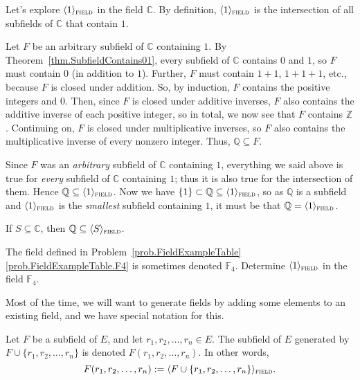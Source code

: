 \begin{example}\label{exam.GenerateField}
Let's explore  $\langle 1 \rangle_{\textsc{field}}$ in the field $\mathbb{C}$. By definition,  $\langle 1 \rangle_{\textsc{field}}$ is the intersection of all subfields of $\mathbb{C}$ that contain $1$. 

Let $F$ be an arbitrary subfield of $\mathbb{C}$ containing $1$. By Theorem~\ref{thm.SubfieldContains01}, every subfield of $\mathbb{C}$ contains $0$ and $1$, so $F$ must  contain $0$ (in addition to $1$). Further, $F$ must contain $1+1$, $1+1+1$, etc., because $F$ is closed under addition. So, by induction,  $F$ contains the positive integers and $0$. Then, since $F$ is closed under additive inverses, $F$ also contains the additive inverse of each positive integer, so in total, we now see that $F$ contains $\mathbb{Z}$. Continuing on, $F$ is closed under multiplicative inverses, so $F$ also contains the multiplicative inverse of every nonzero integer. Thus, $\mathbb{Q} \subseteq F$. 

Since $F$ was an \emph{arbitrary} subfield of $\mathbb{C}$ containing $1$, everything we said above  is true for \emph{every} subfield of $\mathbb{C}$ containing $1$; thus it is also true for the intersection of them. Hence $\mathbb{Q} \subseteq \langle 1 \rangle_{\textsc{field}}$. Now we have $\{1\} \subset \mathbb{Q} \subseteq \langle 1 \rangle_{\textsc{field}}$, so as $\mathbb{Q}$ is a subfield and $\langle 1 \rangle_{\textsc{field}}$ is the \emph{smallest} subfield containing $1$, it must be that $\mathbb{Q} = \langle 1 \rangle_{\textsc{field}}$.
\end{example}


\begin{theorem}\label{thm.BaseFieldC}
If $S\subseteq \mathbb{C}$, then  $\mathbb{Q} \subseteq \langle S \rangle_{\textsc{field}}$.
\end{theorem}

\begin{problem}
The field defined in Problem~\ref{prob.FieldExampleTable}\ref{prob.FieldExampleTable.F4} is sometimes denoted $\mathbb{F}_4$. Determine $\langle 1 \rangle_{\textsc{field}}$ in the field $\mathbb{F}_4$.
\end{problem}

Most of the time, we will want to generate fields by adding some elements to an existing field, and we have special notation for this.

\begin{notation}
Let $F$ be a subfield of $E$, and let $r_1,r_2,\ldots,r_n \in E$. The subfield of $E$ generated by $F\cup \{r_1,r_2,\ldots,r_n\}$ is denoted $F(r_1,r_2,\ldots,r_n)$. In other words, \[F(r_1,r_2,\ldots,r_n) := \langle F\cup \{r_1,r_2,\ldots,r_n\} \rangle_{\textsc{field}}.\]
\end{notation}

